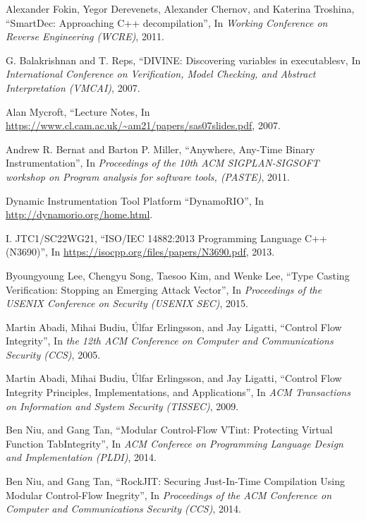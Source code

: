 \documentclass[11pt,a4paper,bibtotoc,idxtotoc,headsepline,footsepline,footexclude,BCOR20mm,DIV10]{scrbook}
\begin{document}
\begin{thebibliography}{50}
Alexander Fokin, Yegor Derevenets, Alexander Chernov, and Katerina Troshina,
``{SmartDec: Approaching C++ decompilation}'', 
In \emph{Working Conference on Reverse Engineering (WCRE)}, 2011.

G. Balakrishnan and T. Reps,
``{DIVINE: Discovering variables in executables}v, 
In \emph{International Conference on Verification, Model Checking, and Abstract Interpretation (VMCAI)}, 2007.

Alan Mycroft,
``{Lecture Notes}, 
In \url{https://www.cl.cam.ac.uk/~am21/papers/sas07slides.pdf}, 2007.

Andrew R. Bernat and Barton P. Miller,
``{Anywhere, Any-Time Binary Instrumentation}'', 
In \emph{Proceedings of the 10th ACM SIGPLAN-SIGSOFT workshop on Program analysis for software tools, (PASTE)}, 2011.

Dynamic Instrumentation Tool Platform
``{DynamoRIO}'', 
In \url{http://dynamorio.org/home.html}.

I. JTC1/SC22WG21,
``{ISO/IEC 14882:2013 Programming Language C++ (N3690)}'', 
In \url{https://isocpp.org/files/papers/N3690.pdf}, 2013.

Byoungyoung Lee, Chengyu Song, Taesoo Kim, and Wenke Lee, 
``{Type Casting Verification: Stopping an Emerging Attack Vector}'', In
\emph{Proceedings of the USENIX Conference on Security (USENIX SEC)}, 2015.

Martin Abadi, Mihai Budiu, Úlfar Erlingsson, and Jay Ligatti,
``{Control Flow Integrity}'', In
\emph{the 12th ACM Conference on Computer and Communications Security (CCS)}, 2005.

Martin Abadi, Mihai Budiu, Úlfar Erlingsson, and Jay Ligatti,
``{Control Flow Integrity Principles, Implementations, and Applications}'', In
\emph{ACM Transactions on Information and System Security (TISSEC)}, 2009.

Ben Niu, and Gang Tan,
``{Modular Control-Flow VTint: Protecting Virtual Function TabIntegrity}'', In
\emph{ACM Conferece on Programming Language Design and Implementation (PLDI)}, 2014.

Ben Niu, and Gang Tan, 
``{RockJIT: Securing Just-In-Time Compilation Using Modular Control-Flow Inegrity}'', In
\emph{Proceedings of the ACM Conference on Computer and Communications Security (CCS)}, 2014.


\end{thebibliography}
\end{document}
